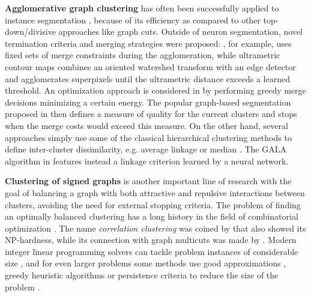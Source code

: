 \textbf{Agglomerative graph clustering} has often been successfully applied to instance segmentation \cite{ren2013image,liu2016image,salembier2000binary}, because of its efficiency as compared to other top-down/divisive approaches like graph cuts. 
Outside of neuron segmentation, novel termination criteria and merging strategies were proposed: \cite{malmberg2011generalized}, for example, uses fixed sets of merge constraints during the agglomeration, while ultrametric contour maps \cite{arbelaez2011contour} combines an oriented watershed transform with an edge detector and agglomerates superpixels until the ultrametric distance exceeds a learned threshold. An optimization approach is considered in \cite{kiran2014global} by performing greedy merge decisions minimizing a certain energy. The popular graph-based segmentation proposed in \cite{felzenszwalb2004efficient} then defines a measure of quality for the current clusters and stops when the merge costs would exceed this measure. 
On the other hand, several approaches simply use some of the classical hierarchical clustering methods to define inter-cluster dissimilarity, e.g. average linkage \cite{liu2018affinity,lee2017superhuman} or median \cite{funke2018large}. The GALA algorithm in \cite{nunez2013machine,knowles2016rhoananet} features instead a linkage criterion learned by a neural network.

\textbf{Clustering of signed graphs} is another important line of research with the goal of balancing a graph with both attractive and repulsive interactions between clusters, avoiding the need for external stopping criteria. The problem of finding an optimally balanced clustering has a long history in the field of combinatorial optimization \cite{grotschel1989cutting,grotschel1990facets,chopra1993partition}. The name \emph{correlation clustering} was coined by \cite{bansal2004correlation} that also showed its NP-hardness, while its connection with graph multicuts was made by \cite{demaine2006correlation}. Modern integer linear programming solvers can tackle problem instances of considerable size \cite{andres2012globally}, and for even larger problems some methods use good approximations \cite{pape2017solving,beier2016efficient,yarkony2012fast}, greedy heuristic algorithms \cite{levinkov2017comparative,wolf2018mutex,keuper2015efficient,kardoostsolving} or persistence criteria to reduce the size of the problem \cite{lange2018partial,lange2018combinatorial}.

